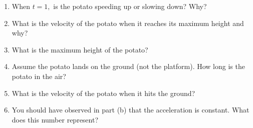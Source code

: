 \documentclass[11pt,fleqn]{article}
\begin{document}
\begin{enumerate}
\begin{enumerate}
	\item When $t=1,$ is the potato speeding up or slowing down? Why?
	\vfill
	\item What is the velocity of the potato when it reaches its maximum height and why?
	\vfill
	\item What is the maximum height of the potato?
	\vfill
	\item Assume the potato lands on the ground (not the platform). How long is the potato in the air?
	\vfill
	\item What is the velocity of the potato when it hits the ground?
	\vfill
	\item You should have observed in part (b) that the acceleration is constant. What does this number represent? 
	\vfill
	\end{enumerate}
\end{enumerate}
\end{document}
